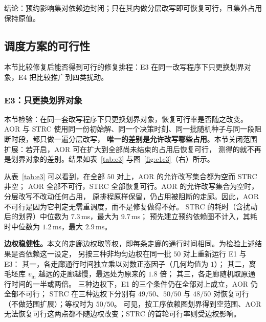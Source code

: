 \documentclass[manuscript,screen,review]{acmart}
\providecommand{\STRC}{\textsc{STRC}}
\newcommand{\NPairs}{50}
\newcommand{\FeasRtwo}{\NPairs/\NPairs}  %
\newcommand{\MsRepairMed}{7.3}
\newcommand{\MsRepairMax}{9.7}
\newcommand{\WeightLogRtwo}{49/\NPairs}
\newcommand{\WeightLuRtwo}{\NPairs/\NPairs}
\newcommand{\WeightSplitRtwo}{48/\NPairs}
\begin{document}
结论：预约影响集对依赖边封闭；只在其内做分层改写即可恢复可行，且集外占用保持原值。

\subsection{调度方案的可行性}
\label{sec:exp_feas}

本节比较修复后能否得到可行的修复排程：E3 在同一改写程序下只更换划界对象，E4 把比较推广到四类扰动。

\subsubsection{E3：只更换划界对象}
\label{sec:e3}

本节检验：在同一套改写程序下只更换划界对象，恢复可行率是否随之改变。
AOR 与 \STRC{} 使用同一份初始解、同一个决策时刻、同一批随机种子与同一段阻断时段，都只做一遍分层改写，
\textbf{唯一的差别是允许改写哪些占用}。本节关闭范围扩展：若开启，AOR 可在扩大到全部尚未结束的占用后恢复可行，
测得的就不再是划界对象的差别。结果如表~\ref{tab:e3} 与图~\ref{fig:e1e3}（右）所示。

从表~\ref{tab:e3} 可以看到，在全部 \(\NPairs\) 对上，AOR 的允许改写集合都为空而 \STRC{} 非空；
AOR 全部不可行，\STRC{} 全部恢复可行。AOR 的允许改写集合为空时，分层改写不改动任何占用，
原排程原样保留，仍占用被阻断的走廊。因此，AOR 不可行是因为它判定无需重调度，而不是修复做得不好。
\STRC{} 的耗时（含扰动后的划界）中位数为 \(\MsRepairMed\)\,ms，最大为 \(\MsRepairMax\)\,ms；
预先建立预约依赖图不计入，其耗时中位数为 \(1.2\)\,ms，最大 \(2.9\)\,ms。

\textbf{边权稳健性。}本文的走廊边权取等权，即每条走廊的通行时间相同。为检验上述结果是否依赖这一设定，
另按三种非均匀边权在同一批 \(\NPairs\) 对上重新运行 E1 与 E3：
其一，各走廊通行时间独立乘以对数正态因子（几何均值为 \(1\)）；
其二，离毛坯库 \(v_{\mathrm{in}}\) 越远的走廊越慢，最远处为原来的 \(1.8\) 倍；
其三，各走廊随机取原通行时间的一半或两倍。
三种边权下，E1 的三个条件仍在全部对上成立，AOR 仍全部不可行；
\STRC{} 在三种边权下分别有 \(\WeightLogRtwo\)、\(\WeightLuRtwo\) 与 \(\WeightSplitRtwo\) 对恢复可行（不做范围扩展）；等权时为 \(\FeasRtwo\)。
可见，按工序依赖图划界得到空范围、AOR 无法恢复可行这两点都不随边权改变；\STRC{} 的首轮可行率则受边权影响。
\end{document}
